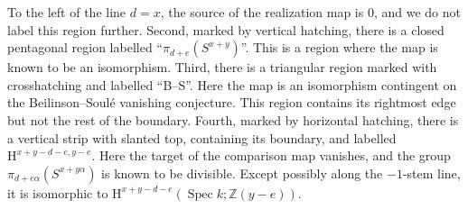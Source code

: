 \documentclass[11pt, oneside, dvipsnames, svgnames, table, final]{amsart}
\newcommand{\mathbx}[1]{\mathbb{#1}}
\theoremstyle{plain}
\theoremstyle{definition}
\theoremstyle{remark}
\newcommand{\Z}{\mathbx{Z}}
\newcommand{\spec}{\operatorname{Spec}}
\newcommand{\Spec}{\spec}
\newcommand{\Hoh}{\mathrm{H}}
\newcommand{\<}[1]{{\langle}#1 {\rangle}}
\begin{document}
To the left of the line $d=x$, the source of the realization map is $0$, and we do not label this region further. Second, marked by vertical hatching, there is a closed pentagonal region labelled  ``$\pi_{d+e}(S^{x+y})$''. This is a region where the map is known to be an isomorphism. Third, there is a triangular region marked with crosshatching and labelled ``B--S''. Here the map is an isomorphism contingent on the Beilinson--Soulé vanishing conjecture. This region contains its rightmost edge but not the rest of the boundary. Fourth, marked by horizontal hatching, there is a vertical strip with slanted top, containing its boundary, and labelled $\Hoh^{x+y-d-e,y-e}$. Here the target of the comparison map vanishes, and the group $\pi_{d+e\alpha}(S^{x+y\alpha})$ is known to be divisible. Except possibly along the $-1$-stem line, it is isomorphic to $\Hoh^{x+y-d-e}(\Spec k; \Z(y-e))$.
\end{document}

